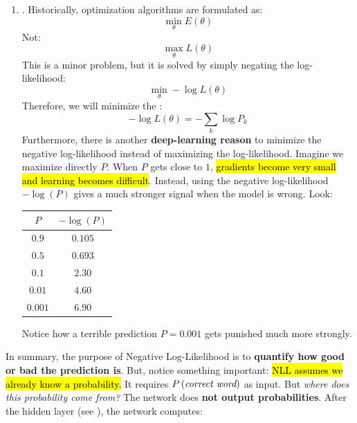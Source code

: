 \begin{enumerate}
    In short, the logarithm transforms products into sums, \hl{avoids numerical underflow} caused by multiplying many small probabilities, and produces a loss function that is easier to optimize with gradient-based methods (solution to the second problem, see below).


    \item {}. Historically, optimization algorithms are formulated as:
    \begin{equation*}
        \min_{\theta} E(\theta)
    \end{equation*}
    Not:
    \begin{equation*}
        \max_{\theta} L(\theta)
    \end{equation*}
    This is a minor problem, but it is solved by simply negating the log-likelihood:
    \begin{equation*}
        \min_{\theta} -\log L(\theta)
    \end{equation*}
    Therefore, we will minimize the :
    \begin{equation}
        -\log L(\theta) = -\sum_k \log P_k
    \end{equation}
    Furthermore, there is another \textbf{deep-learning reason} to minimize the negative log-likelihood instead of maximizing the log-likelihood. Imagine we maximize directly $P$. When $P$ gets close to $1$, \hl{gradients become very small and learning becomes difficult}. Instead, using the negative log-likelihood $-\log\left(P\right)$ gives a much stronger signal when the model is wrong. Look:
    \begin{center}
        \begin{tabular}{@{} c c @{}}
            \toprule
            $P$ & $-\log\left(P\right)$ \\
            \midrule
            $0.9$ & $0.105$ \\
            $0.5$ & $0.693$ \\
            $0.1$ & $2.30$ \\
            $0.01$ & $4.60$ \\
            $0.001$ & $6.90$ \\
            \bottomrule
        \end{tabular}
    \end{center}
    Notice how a terrible prediction $P = 0.001$ gets punished much more strongly.
\end{enumerate}
In summary, the purpose of Negative Log-Likelihood is to \textbf{quantify how good or bad the prediction is}. But, notice something important: \hl{NLL assumes we already know a probability.} It requires $P\left(\emph{correct word}\right)$ as input. But \emph{where does this probability come from?} The network does \textbf{not output probabilities}. After the hidden layer (see ), the network computes:
